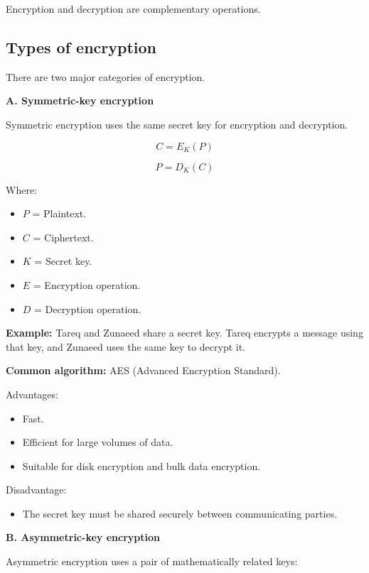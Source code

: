 Encryption and decryption are complementary operations.

\subsection{Types of encryption}

There are two major categories of encryption.

\textbf{A. Symmetric-key encryption}

Symmetric encryption uses the same secret key for encryption and decryption.



\[
C=E_K(P)
\]





\[
P=D_K(C)
\]



Where:

\begin{itemize}
\item $P$ = Plaintext.
\item $C$ = Ciphertext.
\item $K$ = Secret key.
\item $E$ = Encryption operation.
\item $D$ = Decryption operation.
\end{itemize}

\textbf{Example:} Tareq and Zunaeed share a secret key. Tareq encrypts a message using that key, and Zunaeed uses the same key to decrypt it.

\textbf{Common algorithm:} AES (Advanced Encryption Standard).

Advantages:

\begin{itemize}
\item Fast.
\item Efficient for large volumes of data.
\item Suitable for disk encryption and bulk data encryption.
\end{itemize}

Disadvantage:

\begin{itemize}
\item The secret key must be shared securely between communicating parties.
\end{itemize}

\textbf{B. Asymmetric-key encryption}

Asymmetric encryption uses a pair of mathematically related keys:

